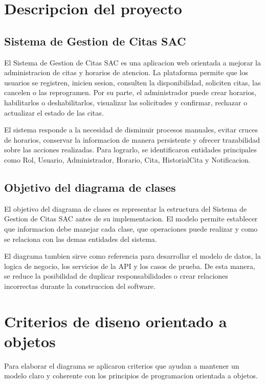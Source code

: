 \documentclass[12pt,letterpaper]{article}
\begin{document}
\section{Descripcion del proyecto}

\subsection{Sistema de Gestion de Citas SAC}

El Sistema de Gestion de Citas SAC es una aplicacion web orientada a mejorar la administracion de citas y horarios de atencion. La plataforma permite que los usuarios se registren, inicien sesion, consulten la disponibilidad, soliciten citas, las cancelen o las reprogramen. Por su parte, el administrador puede crear horarios, habilitarlos o deshabilitarlos, visualizar las solicitudes y confirmar, rechazar o actualizar el estado de las citas.

El sistema responde a la necesidad de disminuir procesos manuales, evitar cruces de horarios, conservar la informacion de manera persistente y ofrecer trazabilidad sobre las acciones realizadas. Para lograrlo, se identificaron entidades principales como Rol, Usuario, Administrador, Horario, Cita, HistorialCita y Notificacion.

\subsection{Objetivo del diagrama de clases}

El objetivo del diagrama de clases es representar la estructura del Sistema de Gestion de Citas SAC antes de su implementacion. El modelo permite establecer que informacion debe manejar cada clase, que operaciones puede realizar y como se relaciona con las demas entidades del sistema.

El diagrama tambien sirve como referencia para desarrollar el modelo de datos, la logica de negocio, los servicios de la API y los casos de prueba. De esta manera, se reduce la posibilidad de duplicar responsabilidades o crear relaciones incorrectas durante la construccion del software.

\section{Criterios de diseno orientado a objetos}

Para elaborar el diagrama se aplicaron criterios que ayudan a mantener un modelo claro y coherente con los principios de programacion orientada a objetos.
\end{document}
